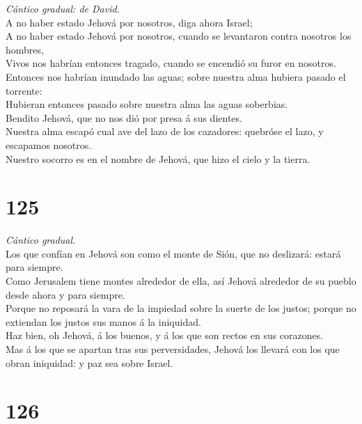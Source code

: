  \emph{Cántico gradual: de David.}\\
A no haber estado Jehová por nosotros, diga ahora Israel;\\
 A no haber estado Jehová por nosotros, cuando se levantaron
contra nosotros los hombres,\\
 Vivos nos habrían entonces tragado, cuando se encendió su
furor en nosotros.\\
 Entonces nos habrían inundado las aguas; sobre nuestra alma
hubiera pasado el torrente:\\
 Hubieran entonces pasado sobre nuestra alma las aguas
soberbias.\\
 Bendito Jehová, que no nos dió por presa á sus dientes.\\
 Nuestra alma escapó cual ave del lazo de los cazadores:
quebróse el lazo, y escapamos nosotros.\\
 Nuestro socorro es en el nombre de Jehová, que hizo el
cielo y la tierra.

\hypertarget{section-124}{%
\section{125}\label{section-124}}

 \emph{Cántico gradual.}\\
Los que confían en Jehová son como el monte de Sión, que no deslizará:
estará para siempre.\\
 Como Jerusalem tiene montes alrededor de ella, así Jehová
alrededor de su pueblo desde ahora y para siempre.\\
 Porque no reposará la vara de la impiedad sobre la suerte
de los justos; porque no extiendan los justos sus manos á la
iniquidad.\\
 Haz bien, oh Jehová, á los buenos, y á los que son rectos
en sus corazones.\\
 Mas á los que se apartan tras sus perversidades, Jehová los
llevará con los que obran iniquidad: y paz sea sobre Israel.

\hypertarget{section-125}{%
\section{126}\label{section-125}}

